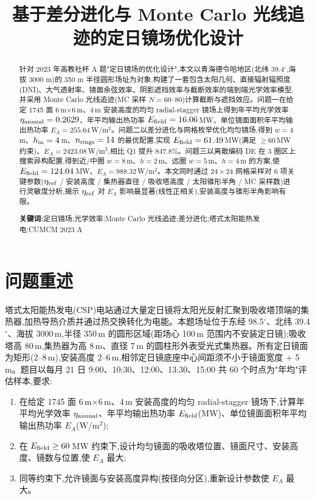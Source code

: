 \documentclass[UTF8,a4paper,12pt]{ctexart}
\title{基于差分进化与 Monte Carlo 光线追迹的定日镜场优化设计}
\author{}
\date{}
\begin{document}
\maketitle
\thispagestyle{plain}

\begin{abstract}
针对 2023 年高教社杯 A 题"定日镜场的优化设计",本文以青海德令哈地区(北纬 39.4$^\circ$,海拔 3000 m)的 350 m 半径圆形场址为对象,构建了一套包含太阳几何、直接辐射辐照度(DNI)、大气透射率、镜面余弦效率、阴影遮挡效率与截断效率的端到端光学效率模型,并采用 Monte Carlo 光线追迹(MC 采样 $N=60$--$80$)计算截断与遮挡效应。问题一在给定 1745 面 6\,m$\times$6\,m、4\,m 安装高度的均匀 radial-stagger 镜场上得到年平均光学效率 $\eta_{\rm annual}=0.2629$、年平均输出热功率 $E_{\rm field}=16.06$\,MW、单位镜面面积年平均输出热功率 $E_A=255.64$\,W/m$^2$。问题二以差分进化与网格枚举优化均匀镜场,得到 $w=4$\,m、$h_{\rm in}=4$\,m、$n_{\rm rings}=14$ 的最优配置,实现 $E_{\rm field}=61.49$\,MW(满足 $\ge 60$\,MW 约束)、$E_A=2423.08$\,W/m$^2$,相比 Q1 提升 $847.8\%$。问题三以离散编码 DE 在 3 圈区上搜索异构配置,得到近/中圈 $w=8$\,m、$h=2$\,m、远圈 $w=5$\,m、$h=4$\,m 的方案,使 $E_{\rm field}=124.04$\,MW、$E_A=988.32$\,W/m$^2$。本文同时通过 $24\times 24$ 网格采样对 6 项关键参数($\eta_{\rm ref}$ / 安装高度 / 集热器直径 / 吸收塔高度 / 太阳锥形半角 / MC 采样数)进行灵敏度分析,揭示 $\eta_{\rm ref}$ 对 $E_A$ 影响最显著(线性正相关),安装高度与锥形半角影响有限。

\textbf{关键词:}定日镜场;光学效率;Monte Carlo 光线追迹;差分进化;塔式太阳能热发电;CUMCM 2023 A
\end{abstract}
\newpage

\tableofcontents
\newpage

\section{问题重述}
塔式太阳能热发电(CSP)电站通过大量定日镜将太阳光反射汇聚到吸收塔顶端的集热器,加热导热介质并通过热交换转化为电能。本题场址位于东经 98.5$^\circ$、北纬 39.4$^\circ$、海拔 3000\,m,半径 350\,m 的圆形区域(距场心 100\,m 范围内不安装定日镜);吸收塔高 80\,m,集热器为高 8\,m、直径 7\,m 的圆柱形外表受光式集热器。所有定日镜面为矩形(2--8\,m),安装高度 2--6\,m,相邻定日镜底座中心间距须不小于镜面宽度 + 5\,m。题目以每月 21 日 9:00、10:30、12:00、13:30、15:00 共 60 个时点为"年均"评估样本,要求:

\begin{enumerate}[label=\textbf{\arabic*.}, leftmargin=2em]
  \item 在给定 1745 面 6\,m$\times$6\,m、4\,m 安装高度的均匀 radial-stagger 镜场下,计算年平均光学效率 $\eta_{\rm annual}$、年平均输出热功率 $E_{\rm field}$(MW)、单位镜面面积年平均输出热功率 $E_A$(W/m$^2$);
  \item 在 $E_{\rm field}\ge 60$\,MW 约束下,设计均匀镜面的吸收塔位置、镜面尺寸、安装高度、镜数与位置,使 $E_A$ 最大;
  \item 同等约束下,允许镜面与安装高度异构(按径向分区),重新设计参数使 $E_A$ 最大。
\end{enumerate}
\end{document}
